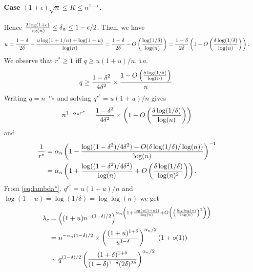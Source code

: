 \documentclass[final]{colt2026}
\newcommand{\1}{\mathbf{1}}
\newcommand{\pa}[1]{\left(#1\right)}
\begin{document}
\paragraph{Case $(1+\epsilon)\sqrt{n}\leq K\leq n^{1-\epsilon}$.} Hence ${2\log(1+\epsilon)\over \log(n)}\leq \delta_{n}\leq 1-\epsilon/2$. 
Then, we have
$$u={1-\delta\over 2\delta} -{u\log(1+1/u)+\log(1+u)\over \log(n)}={1-\delta\over 2\delta}-O\pa{\log(1/\delta)\over \log(n)}={1-\delta\over 2\delta}\pa{1-O\pa{\delta\log(1/\delta)\over \log(n)}}.$$
We observe that $r^*\geq 1$ iff $q\geq u(1+u)/n$,
i.e. 
\begin{equation}\label{eq:outKS}
q\geq {1-\delta^2\over 4\delta^2}\times{1-O\pa{\delta\log(1/\delta)\over \log(n)}\over n}.
\end{equation}
Writing $q=n^{-\alpha_{n}}$ and solving $q^{r^*}= u(1+u)/n$
gives 
$$n^{1-\alpha_{n}r^*}={1-\delta^2\over 4\delta^2}\times\pa{1-O\pa{\delta\log(1/\delta)\over \log(n)}}$$
and
\begin{align}
{1\over r^*}&= \alpha_{n} \pa{1-{\log((1-\delta^2)/4\delta^2)-O(\delta\log(1/\delta)/\log(n))\over \log(n)}}^{-1}\nonumber\\
&=\alpha_{n}\pa{1+{\log((1-\delta^2)/4\delta^2)\over \log(n)}+O\pa{\delta\log(1/\delta)\over \log(n)^2}}.\label{eq:r*value}
\end{align}
From \eqref{eq:lambda*}, $q^{r^*}= u(1+u)/n$ and $\log(1+u)=\log(1/\delta)=\log\log(n)$ we get
\begin{align*}
\lambda_{c}&= \pa{(1+u) n^{-(1-\delta)/2}}^{\alpha_{n}\pa{1+{\log(u(1+u))\over \log(n)}+O\pa{\pa{\log\log(n)\over \log(n)}^2}}}\\
&=n^{-\alpha_{n}(1-\delta)/2}\times\pa{(1+u)^{1+\delta}\over u^{1-\delta}}^{\alpha_{n}/2}(1+o(1))\\
&\sim q^{(1-\delta)/2} \pa{(1+\delta)^{1+\delta}\over (1-\delta)^{1-\delta}(2\delta)^{2\delta}}^{\alpha_{n}/2}.
\end{align*}
\end{document}
